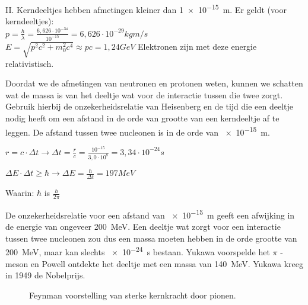 \begin{questions}
II. Kerndeeltjes hebben afmetingen kleiner dan \SI{1e-15}{\meter}. 
Er geldt (voor kerndeeltjes):\\
$p = \frac{h}{\lambda} = \frac{6,626\cdot 10^{-34}}{10^{-15}} = 6,626 \cdot 10^{-29} kgm/s$\\
$E= \sqrt{p^{2}c^{2}+m_0^{2}c^{4}} \approx pc = 1,24 GeV$
Elektronen zijn met deze energie relativistisch. 

\question
Doordat we de afmetingen van neutronen en protonen weten, kunnen we schatten wat 
de massa is van het deeltje wat voor de interactie tussen die twee zorgt.
Gebruik hierbij de onzekerheidsrelatie van Heisenberg en de tijd die een deeltje
nodig heeft om een afstand in de orde van grootte van een kerndeeltje af te leggen.
De afstand tussen twee nucleonen is in de orde van \SI{e-15}{m}.

 
$r = c \cdot \Delta t \rightarrow \Delta t = \frac{r}{c} = \frac{10^{-15}}{3,0\cdot 10^{8}}= 3,34\cdot 10^{-24} s$

$\Delta E \cdot \Delta t \geq \hbar \rightarrow \Delta E = \frac {\hbar}{\Delta t} = 197 MeV$

Waarin: $\hbar$ is $ \frac{h}{2\pi}$
 

De onzekerheidsrelatie voor een afstand van \SI{e-15}{m} geeft een afwijking in de energie van 
ongeveer \SI{200}{\mega\electronvolt}. Een deeltje wat zorgt voor een interactie tussen 
twee nucleonen zou dus een massa moeten hebben in de orde grootte van \SI{200}{\mega\electronvolt},
maar kan slechts \SI{e-24}{\second} bestaan. Yukawa voorspelde het $\pi$ -meson en Powell ontdekte het deeltje 
met een massa van \SI{140}{\mega\electronvolt}. Yukawa kreeg in 1949 de Nobelprijs.

\begin{figure}
\caption{ Feynman voorstelling van sterke kernkracht door pionen.}
\end{figure}
\end{questions}
